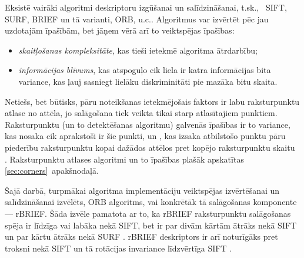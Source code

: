 Eksistē vairāki algoritmi deskriptoru izgūšanai un
salīdzināšanai, t.sk.,~%
SIFT, %
SURF, BRIEF un tā varianti, ORB, u.c..
Algoritmus var izvērtēt pēc jau uzdotajām īpašībām, 
bet jāņem vērā arī to veiktspējas īpašības:
\begin{itemize}
	\item \emph{skaitļošanas kompleksitāte}, kas tieši ietekmē algoritma
		ātrdarbību;
	\item \emph{informācijas blīvums}, kas atspoguļo cik liela ir katra
		informācijas bita variance, kas ļauj sasniegt lielāku diskriminitāti
		pie mazāka bitu skaita.
\end{itemize}

Netiešs, bet būtisks, pāru noteikšanas ietekmējošais faktors ir 
labu raksturpunktu
atlase no attēla, jo salāgošana tiek veikta tikai starp atlasītajiem
punktiem. Raksturpunktu (un to detektēšanas algoritmu) galvenās īpašības
ir to variance, kas nosaka cik aprakstoši ir šie punkti,
un , kas izsaka atbilstošo punktu pāru piederību
raksturpunktu kopai dažādos attēlos pret kopējo raksturpunktu skaitu~%
\cite{FAST}\cite{SIFT-FPGA}.
Raksturpunktu atlases algoritmi un to īpašības plašāk apskatītas
\ref{sec:corners}~apakšnodaļā.

Šajā darbā, turpmākai algoritma implementāciju veiktspējas izvērtēšanai
un salīdzināšanai izvēlēts, ORB algoritms, vai konkrētāk tā salāgošanas
komponente --- rBRIEF.
Šāda izvēle pamatota ar to, ka rBRIEF raksturpunktu salāgošanas
spēja ir līdzīga vai labāka nekā SIFT, bet ir par divām kārtām ātrāks nekā
SIFT un par kārtu ātrāks nekā SURF \cite{ORB}.
rBRIEF deskriptors ir arī noturīgāks pret troksni nekā
SIFT un tā rotācijas invariance līdzvērtīga SIFT \cite{ORB}.



